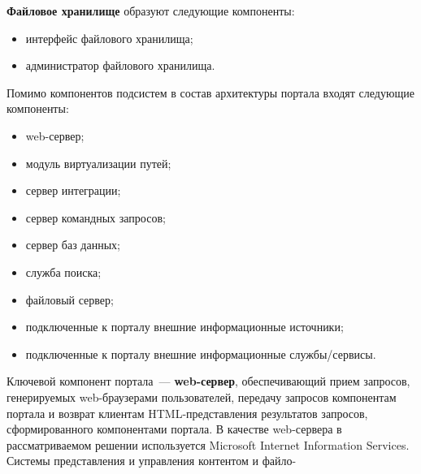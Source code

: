 \begin{multicols}{2}
 \textbf{Файловое хранилище} образуют следующие компоненты:
 \begin{itemize}
\item интерфейс файлового хранилища;
\item администратор файлового хранилища.
\end{itemize}

 Помимо компонентов подсистем в состав архитектуры портала входят следующие
компоненты:
 \begin{itemize}
\item web-сервер;
\item модуль виртуализации путей;
\item сервер интеграции;
\item сервер командных запросов;
\item сервер баз данных;
\item служба поиска;
\item файловый сервер;
\item подключенные к порталу внешние информационные источники;
\item подключенные к порталу внешние информационные службы/сервисы.
 \end{itemize}

 Ключевой компонент портала~--- \textbf{web-сервер}, обеспечивающий прием
запросов, генерируемых web-браузерами пользователей, передачу запросов компонентам
портала и возврат клиентам HTML-представления результатов запросов,
сформированного компонентами портала. В качестве web-сервера в рассматриваемом
решении используется Microsoft Internet Information Services. Системы
представления и управления контентом и файло-\linebreak
\vspace*{-12pt}
\pagebreak
\end{multicols}

 \begin{figure} %
\vspace*{1pt}
\begin{center}
\mbox{%
\epsfxsize=125.584mm
}
\end{center}
 \end{figure}

